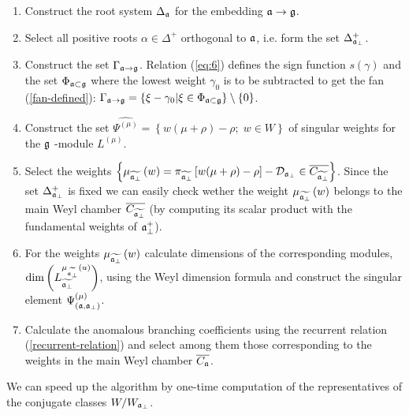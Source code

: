 \begin{enumerate}
\item  Construct the root system $\Delta _{\mathfrak{a}}$ for the embedding $%
\af\rightarrow \frak{g}$.

\item  Select all positive roots $\alpha \in \Delta ^{+}$ orthogonal
to  $\mathfrak{a}$, i.e. form the set $\Delta_{\mathfrak{a}_{\bot} }^{+}$.

\item  Construct the set $\Gamma _{\mathfrak{a}\rightarrow \frak{g}}$. Relation
 (\ref{eq:6}) defines the sign function
 $s(\gamma)$ and the set $\Phi_{\mathfrak{a}\subset \frak{g}}$ where the lowest weight
 $\gamma_0$ is to be subtracted to get the fan (\ref{fan-defined}):
 $\Gamma _{\af\rightarrow \frak{g}}=\left\{ \xi -\gamma _{0}|\xi \in \Phi _{%
\af\subset \frak{g}}\right\} \setminus \left\{ 0\right\}$.

\item  Construct the set $\widehat{\Psi ^{(\mu )}}=\left\{ w (\mu +\rho
)-\rho ;\;w \in W\right\} $ of singular weights for the $\frak{g}$%
-module $L^{(\mu )}$.

\item  Select the weights $\left\{ \mu _{\widetilde{\af_{\perp }}%
}\left( w\right) =\pi _{\widetilde{\af_{\perp }}}\left[ w(\mu +\rho
)-\rho \right] -\mathcal{D}_{\af_{\perp }}\in \overline{C_{\widetilde{%
\af_{\perp }}}}\right\} $. Since the set $\Delta_{\mathfrak{a}_{\bot} }^{+}$ is fixed
we can easily check wether the weight $\mu _{\widetilde{\af_{\perp }}%
}\left( w\right) $ belongs to the main Weyl chamber $\overline{C_{\widetilde{%
\af_{\perp }}}}$ (by computing its scalar product with the fundamental
weights of $\mathfrak{a}_{\bot}^{+}$).

\item  For the weights $\mu _{\widetilde{\mathfrak{a}_{\perp }}}\left( w\right) $
calculate dimensions of the corresponding modules, $\mathrm{\dim }\left(
L_{\widetilde{\af_{\perp }}}^{\mu _{\widetilde{\af_{\perp }}%
}\left( u\right) }\right) $, using the Weyl dimension formula and construct
the singular element $\Psi ^{\left( \mu \right) }_{\left(  \mathfrak{a}, \mathfrak{a}_{\bot} \right)}$.

\item  Calculate the anomalous branching coefficients using the
recurrent relation (\ref{recurrent-relation}) and select among them those
corresponding to the weights in the main Weyl
chamber $\overline{C_{\mathfrak{a}}}$.
\end{enumerate}

We can speed up the algorithm by
one-time computation of the representatives of the conjugate classes $%
W/W_{\afb }$.

